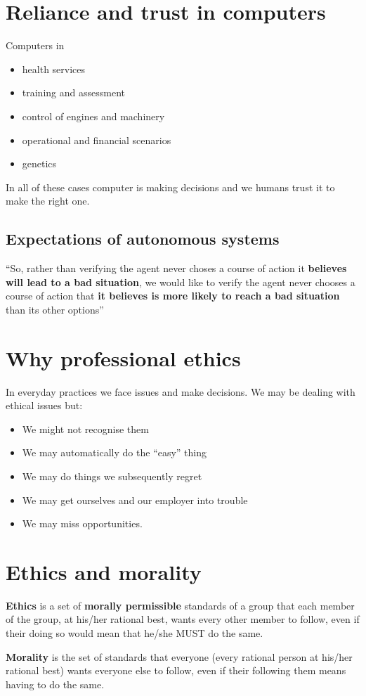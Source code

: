 \documentclass{article}
\begin{document}
\tableofcontents

\newpage

\section{Reliance and trust in computers}
Computers in
\begin{itemize}
  \item health services
  \item training and assessment
  \item control of engines and machinery
  \item operational and financial scenarios
  \item genetics
\end{itemize}
In all of these cases computer is making decisions and we humans trust it to make the right one.

\subsection{Expectations of autonomous systems}

``So, rather than verifying the agent never choses a course of action it \textbf{believes will lead to a bad situation}, we would like to verify the agent never chooses a course of action that \textbf{it believes is more likely to reach a bad situation} than its other options''

\section{Why professional ethics}

\begin{flushleft}
In everyday practices we face issues and make decisions. We may be dealing with ethical issues but:
\end{flushleft}
\begin{itemize}
  \item We might not recognise them
  \item We may automatically do the “easy” thing
  \item We may do things we subsequently regret
  \item We may get ourselves and our employer into trouble
  \item We may miss opportunities.
\end{itemize}

\section{Ethics and morality}
\begin{flushleft}
\textbf{Ethics} is a set of \textbf{morally permissible} standards of a group that each member of the group, at his/her rational best, wants every other member to follow, even if their doing so would mean that he/she MUST do the same.

\bigskip

\textbf{Morality} is the set of standards that everyone (every rational person at his/her rational best) wants everyone else to follow, even if their following them means having to do the same.
\end{flushleft}
\end{document}
